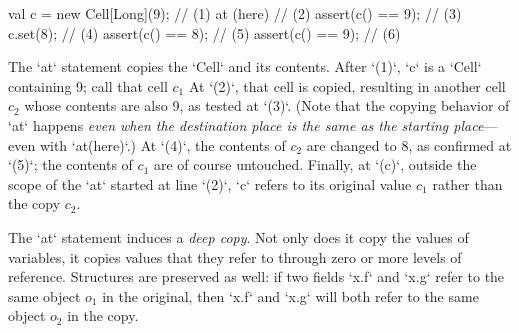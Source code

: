\begin{ex}

% 
\begin{xten}
val c = new Cell[Long](9); // (1)
at (here) {               // (2) 
   assert(c() == 9);      // (3)
   c.set(8);              // (4)
   assert(c() == 8);      // (5)
}
assert(c() == 9);         // (6)
\end{xten}


The \xcd`at` statement copies the \xcd`Cell` and its contents.  
After \xcd`(1)`, \xcd`c` is a \xcd`Cell` containing 9; call that cell {$c_1$}
At \xcd`(2)`, that cell is copied, resulting in another cell {$c_2$} whose
contents are also 9, as tested at \xcd`(3)`.
(Note that the copying behavior of \xcd`at` happens {\em even when the
destination place is the same as the starting place}--- even with
\xcd`at(here)`.)
At \xcd`(4)`, the contents of {$c_2$} are changed to 8, as confirmed at \xcd`(5)`; the contents of
{$c_1$} are of course untouched.    Finally, at \xcd`(c)`, outside the scope
of the \xcd`at` started at line \xcd`(2)`, \xcd`c` refers to its original
value {$c_1$} rather than the copy {$c_2$}.  
\end{ex}

The \xcd`at` statement induces a {\em deep copy}.  Not only does it copy the
values of variables, it copies values that they refer to through zero or more
levels of reference.  Structures are preserved as well: if two fields
\xcd`x.f` and \xcd`x.g` refer to the same object {$o_1$} in the original, then
\xcd`x.f` and \xcd`x.g` will both refer to the same object {$o_2$} in the
copy.  

